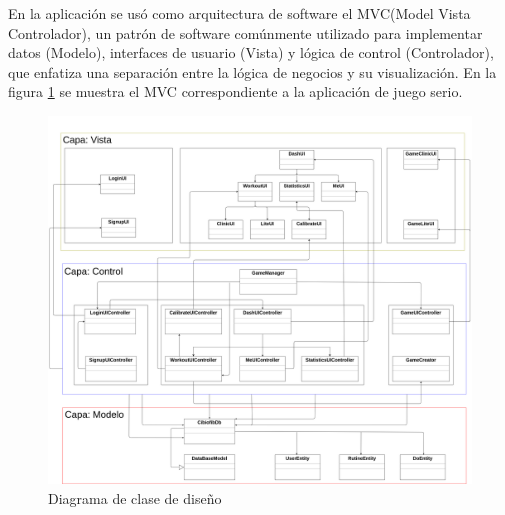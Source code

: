 
En la aplicación se usó como arquitectura de software el MVC(Model Vista Controlador), un patrón de software comúnmente utilizado para implementar datos (Modelo), interfaces de usuario (Vista) y lógica de control (Controlador), que enfatiza una separación entre la lógica de negocios y su visualización. En la figura \ref{fig: software-architecture} se muestra el MVC correspondiente a la aplicación de juego serio.

\begin{figure}[ht]
    \centering
    \includegraphics[scale=0.19]{images/software-architecture.png}
    \caption{Diagrama de clase de diseño}
    \label{fig: software-architecture}
\end{figure}



